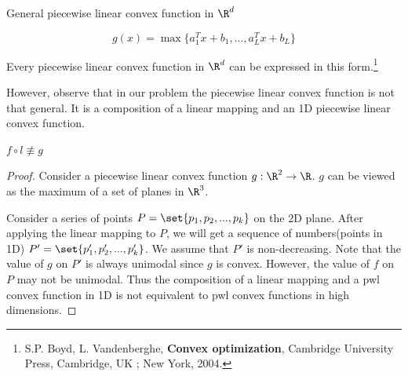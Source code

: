 \documentclass{beamer}
\begin{document}
\begin{frame}{General piecewise linear convex function in $\R^d$}
\begin{definition}\label{def:pwlc}
\[
g(x)=\max \{a_1^Tx+b_1,\ldots,a_L^Tx+b_L\}
\]
\end{definition}

Every piecewise linear convex function in $\R^d$ can be expressed in this form.\footnote{S.P. Boyd, L. Vandenberghe, \textbf{Convex optimization}, Cambridge University Press, Cambridge, UK ; New York, 2004.}

However, observe that in our problem the piecewise linear convex function is not that general. It is a composition of a linear mapping and an 1D piecewise linear convex function.

\end{frame}

\begin{frame}{$f\circ l\not \equiv g$}
    \begin{proof}
    \small
    Consider a piecewise linear convex function $g:\R^2\to \R$. $g$ can be viewed as the maximum of a set of planes in $\R^3$.

    Consider a series of points $P=\set{p_1,p_2,...,p_k}$ on the 2D plane. After applying the linear mapping to $P$, we will get a sequence of numbers(points in 1D) $P'=\set{p_1',p_2',...,p_k'}$. We assume that $P'$ is non-decreasing. Note that the value of $g$ on $P'$ is always unimodal since $g$ is convex. However, the value of $f$ on $P$ may not be unimodal. Thus the composition of a linear mapping and a pwl convex function in 1D is not equivalent to pwl convex functions in high dimensions.
    \end{proof}
\end{frame}
\end{document}

